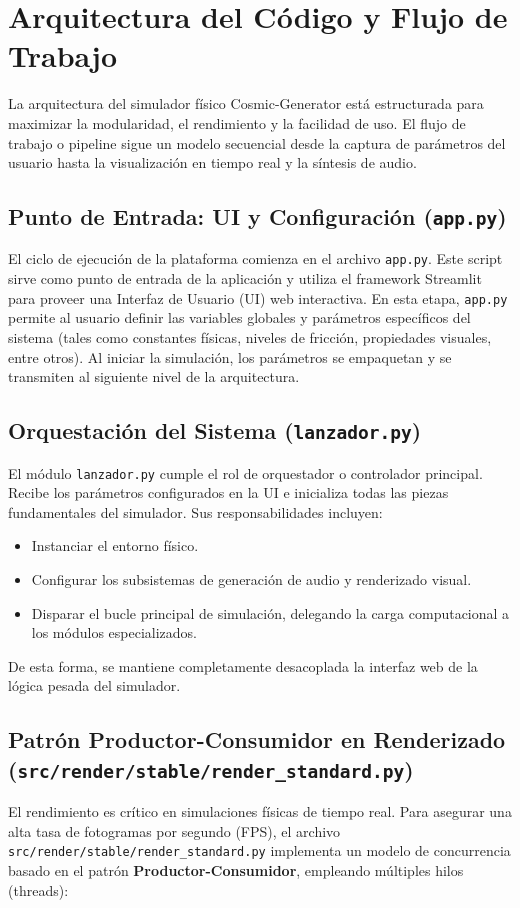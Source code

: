 \documentclass[12pt]{article}
\begin{document}
\section{Arquitectura del Código y Flujo de Trabajo}

La arquitectura del simulador físico Cosmic-Generator está estructurada para maximizar la modularidad, el rendimiento y la facilidad de uso. El flujo de trabajo o pipeline sigue un modelo secuencial desde la captura de parámetros del usuario hasta la visualización en tiempo real y la síntesis de audio.

\subsection{Punto de Entrada: UI y Configuración (\texttt{app.py})}
El ciclo de ejecución de la plataforma comienza en el archivo \texttt{app.py}. Este script sirve como punto de entrada de la aplicación y utiliza el framework Streamlit para proveer una Interfaz de Usuario (UI) web interactiva. En esta etapa, \texttt{app.py} permite al usuario definir las variables globales y parámetros específicos del sistema (tales como constantes físicas, niveles de fricción, propiedades visuales, entre otros). Al iniciar la simulación, los parámetros se empaquetan y se transmiten al siguiente nivel de la arquitectura.

\subsection{Orquestación del Sistema (\texttt{lanzador.py})}
El módulo \texttt{lanzador.py} cumple el rol de orquestador o controlador principal. Recibe los parámetros configurados en la UI e inicializa todas las piezas fundamentales del simulador. Sus responsabilidades incluyen:
\begin{itemize}
    \item Instanciar el entorno físico.
    \item Configurar los subsistemas de generación de audio y renderizado visual.
    \item Disparar el bucle principal de simulación, delegando la carga computacional a los módulos especializados.
\end{itemize}
De esta forma, se mantiene completamente desacoplada la interfaz web de la lógica pesada del simulador.

\subsection{Patrón Productor-Consumidor en Renderizado (\texttt{src/render/stable/render\_standard.py})}
El rendimiento es crítico en simulaciones físicas de tiempo real. Para asegurar una alta tasa de fotogramas por segundo (FPS), el archivo \texttt{src/render/stable/render\_standard.py} implementa un modelo de concurrencia basado en el patrón \textbf{Productor-Consumidor}, empleando múltiples hilos (threads):
\end{document}
